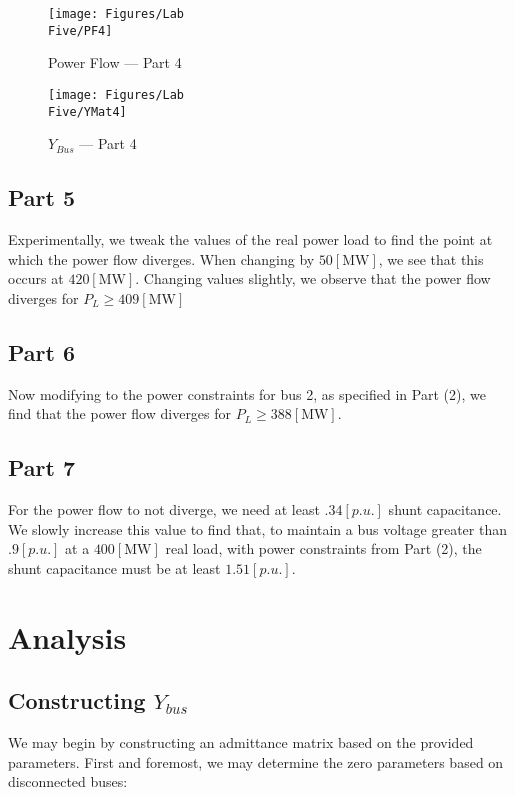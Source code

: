 \documentclass[
	letterpaper, %
	10pt, %
]{CSUniSchoolLabReport}
\begin{document}
\begin{figure}[H]
  \centering
  \texttt{[image: Figures/Lab\\ Five/PF4]}
  \caption{Power Flow — Part 4}
  \label{fig:8}
\end{figure}

\begin{figure}[H]
  \centering
  \texttt{[image: Figures/Lab\\ Five/YMat4]}
  \caption{$Y_{Bus}$ — Part 4}
  \label{fig:9}
\end{figure}

\subsection{Part 5}

Experimentally, we tweak the values of the real power load to find the point at which the power flow diverges. When changing by $50[\si{\mega\watt}]$, we see that this occurs at $420[\si{\mega\watt}]$. Changing values slightly, we observe that the power flow diverges for $P_L\geq 409[\si{\mega\watt}]$

\subsection{Part 6}

Now modifying to the power constraints for bus 2, as specified in Part (2), we find that the power flow diverges for $P_L\geq 388[\si{\mega\watt}]$.

\subsection{Part 7}

For the power flow to not diverge, we need at least $.34[p.u.]$ shunt capacitance. We slowly increase this value to find that, to maintain a bus voltage greater than $.9[p.u.]$ at a $400[\si{\mega\watt}]$ real load, with power constraints from Part (2), the shunt capacitance must be at least $1.51[p.u.]$.

\section{Analysis}

\subsection{Constructing $Y_{bus}$}

We may begin by constructing an admittance matrix based on the provided parameters. First and foremost, we may determine the zero parameters based on disconnected buses:
\end{document}
